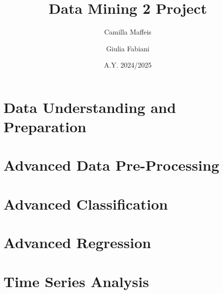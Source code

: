 \documentclass[a4paper, 10pt, twocolumn, DIV=calc]{scrartcl}
\begin{document}
\author{Camilla Maffeis \and Giulia Fabiani}
\title{Data Mining 2 Project}
\date{A.Y. 2024/2025}


\begin{titlepage}
    \maketitle
    \vfill
    \tableofcontents
    \vfill
\end{titlepage}

\section{Data Understanding and Preparation}
\label{data_understanding}


\section{Advanced Data Pre-Processing}



\section{Advanced Classification}



\section{Advanced Regression}



\section{Time Series Analysis}
\label{time_series_analysis}




\end{document}
